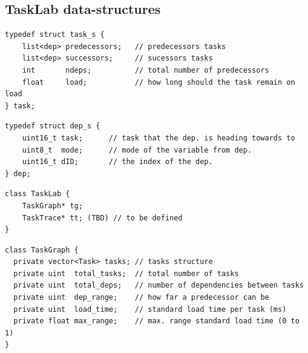 

\subsection{TaskLab data-structures} 


\begin{verbatim}
typedef struct task_s {
    list<dep> predecessors;   // predecessors tasks
    list<dep> successors;     // sucessors tasks
    int       ndeps;          // total number of predecessors
    float     load;           // how long should the task remain on load
} task;

\end{verbatim}


\begin{verbatim}
typedef struct dep_s {
    uint16_t task;      // task that the dep. is heading towards to
    uint8_t  mode;      // mode of the variable from dep.
    uint16_t dID;       // the index of the dep.
} dep;
\end{verbatim}


\begin{verbatim}
class TaskLab {
    TaskGraph* tg;
    TaskTrace* tt; (TBD) // to be defined
}
\end{verbatim}

\begin{verbatim}
class TaskGraph {
  private vector<Task> tasks; // tasks structure
  private uint  total_tasks;  // total number of tasks
  private uint  total_deps;   // number of dependencies between tasks
  private uint  dep_range;    // how far a predecessor can be
  private uint  load_time;    // standard load time per task (ms)
  private float max_range;    // max. range standard load time (0 to 1) 
}
\end{verbatim}

